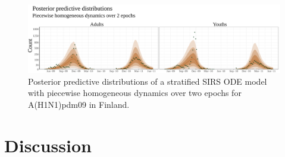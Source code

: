 \begin{figure}[htbp]
	\centering
	\includegraphics[width=\linewidth]{figures/flu_postpred_2epoch_ode}
	\caption{Posterior predictive distributions of a stratified SIRS ODE model with piecewise homogeneous dynamics over two epochs for A(H1N1)pdm09 in Finland.}
	\label{fig:flupostpred2epochode}
\end{figure}

\section{Discussion}
\label{sec:flu_discussion}
